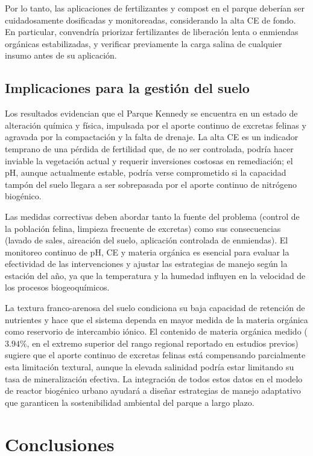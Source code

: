 \documentclass[fleqn]{jaes}
\begin{document}
Por lo tanto, las aplicaciones de fertilizantes y compost en el parque deberían ser cuidadosamente dosificadas y monitoreadas, considerando la alta CE de fondo. En particular, convendría priorizar fertilizantes de liberación lenta o enmiendas orgánicas estabilizadas, y verificar previamente la carga salina de cualquier insumo antes de su aplicación.

\subsection{Implicaciones para la gestión del suelo}

Los resultados evidencian que el Parque Kennedy se encuentra en un estado de alteración química y física, impulsada por el aporte continuo de excretas felinas y agravada por la compactación y la falta de drenaje. La alta CE es un indicador temprano de una pérdida de fertilidad que, de no ser controlada, podría hacer inviable la vegetación actual y requerir inversiones costosas en remediación; el pH, aunque actualmente estable, podría verse comprometido si la capacidad tampón del suelo llegara a ser sobrepasada por el aporte continuo de nitrógeno biogénico.

Las medidas correctivas deben abordar tanto la fuente del problema (control de la población felina, limpieza frecuente de excretas) como sus consecuencias (lavado de sales, aireación del suelo, aplicación controlada de enmiendas). El monitoreo continuo de pH, CE y materia orgánica es esencial para evaluar la efectividad de las intervenciones y ajustar las estrategias de manejo según la estación del año, ya que la temperatura y la humedad influyen en la velocidad de los procesos biogeoquímicos.

La textura franco-arenosa del suelo condiciona su baja capacidad de retención de nutrientes y hace que el sistema dependa en mayor medida de la materia orgánica como reservorio de intercambio iónico. El contenido de materia orgánica medido ($3.94\%$, en el extremo superior del rango regional reportado en estudios previos) sugiere que el aporte continuo de excretas felinas está compensando parcialmente esta limitación textural, aunque la elevada salinidad podría estar limitando su tasa de mineralización efectiva. La integración de todos estos datos en el modelo de reactor biogénico urbano ayudará a diseñar estrategias de manejo adaptativo que garanticen la sostenibilidad ambiental del parque a largo plazo.

\section{Conclusiones}\label{sec:conclusiones}
\end{document}
